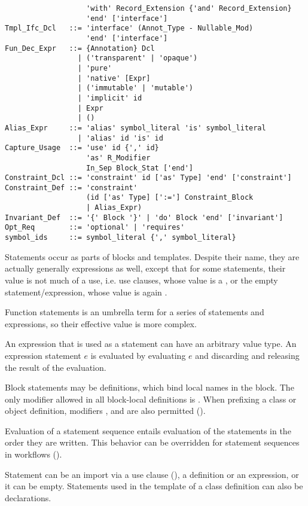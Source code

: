 \begin{lstlisting}
                   'with' Record_Extension {'and' Record_Extension} 
                   'end' ['interface']
Tmpl_Ifc_Dcl   ::= 'interface' (Annot_Type - Nullable_Mod) 
                   'end' ['interface']
Fun_Dec_Expr   ::= {Annotation} Dcl
                 | ('transparent' | 'opaque')
                 | 'pure'
                 | 'native' [Expr]
                 | ('immutable' | 'mutable')
                 | 'implicit' id
                 | Expr
                 | ()
Alias_Expr     ::= 'alias' symbol_literal 'is' symbol_literal
                 | 'alias' id 'is' id
Capture_Usage  ::= 'use' id {',' id} 
                   'as' R_Modifier
                   In_Sep Block_Stat ['end']
Constraint_Dcl ::= 'constraint' id ['as' Type] 'end' ['constraint']
Constraint_Def ::= 'constraint' 
                   (id ['as' Type] [':='] Constraint_Block 
                   | Alias_Expr)
Invariant_Def  ::= '{' Block '}' | 'do' Block 'end' ['invariant']
Opt_Req        ::= 'optional' | 'requires'
symbol_ids     ::= symbol_literal {',' symbol_literal}
\end{lstlisting}

Statements occur as parts of blocks and templates. Despite their name, they are actually generally expressions as well, except that for some statements, their value is not much of a use, i.e. use clauses, whose value is a , or the empty statement/expression, whose value is again . 

Function statements is an umbrella term for a series of statements and expressions, so their effective value is more complex. 

An expression that is used as a statement can have an arbitrary value type. An expression statement $e$ is evaluated by evaluating $e$ and discarding and releasing the result of the evaluation. 

Block statements may be definitions, which bind local names in the block. The only modifier allowed in all block-local definitions is . When prefixing a class or object definition, modifiers ,  and  are also permitted ().

Evaluation of a statement sequence entails evaluation of the statements in the order they are written. This behavior can be overridden for statement sequences in workflows ().

Statement can be an import via a use clause (), a definition or an expression, or it can be empty. Statements used in the template of a class definition can also be declarations. 

